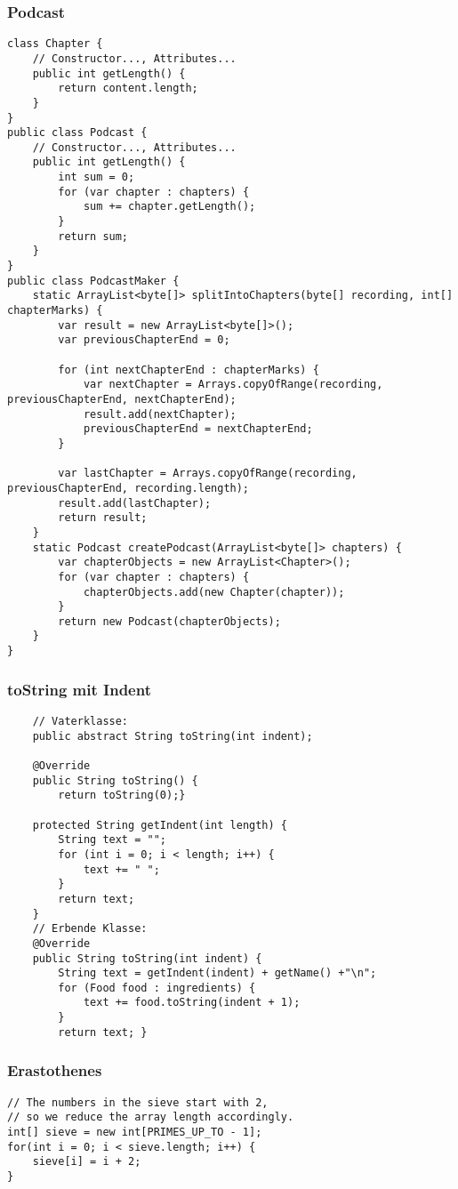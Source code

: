 \begin{multicols*}{5}
	\subsubsection{Podcast}
	\begin{lstlisting}
class Chapter {
	// Constructor..., Attributes...
	public int getLength() {
		return content.length;
	}
}
public class Podcast {
	// Constructor..., Attributes...
	public int getLength() {
		int sum = 0;
		for (var chapter : chapters) {
			sum += chapter.getLength();
		}
		return sum;
	}
}
public class PodcastMaker {
	static ArrayList<byte[]> splitIntoChapters(byte[] recording, int[] chapterMarks) {
		var result = new ArrayList<byte[]>();
		var previousChapterEnd = 0;
		
		for (int nextChapterEnd : chapterMarks) {
			var nextChapter = Arrays.copyOfRange(recording, previousChapterEnd, nextChapterEnd);
			result.add(nextChapter);
			previousChapterEnd = nextChapterEnd;
		}
		
		var lastChapter = Arrays.copyOfRange(recording, previousChapterEnd, recording.length);
		result.add(lastChapter);
		return result;
	}
	static Podcast createPodcast(ArrayList<byte[]> chapters) {
		var chapterObjects = new ArrayList<Chapter>();
		for (var chapter : chapters) {
			chapterObjects.add(new Chapter(chapter));
		}
		return new Podcast(chapterObjects);
	}
}
	\end{lstlisting}

	\subsubsection{toString mit Indent}
	\begin{lstlisting}
	// Vaterklasse:
	public abstract String toString(int indent);			
	
	@Override
	public String toString() {
		return toString(0);}
	
	protected String getIndent(int length) { 
		String text = ""; 
		for (int i = 0; i < length; i++) { 
			text += " ";
		}
		return text;
	}
	// Erbende Klasse:
	@Override
	public String toString(int indent) {
		String text = getIndent(indent) + getName() +"\n";
		for (Food food : ingredients) {
			text += food.toString(indent + 1);
		}
		return text; }
	\end{lstlisting}

	\subsubsection{Erastothenes}
		\begin{lstlisting}
// The numbers in the sieve start with 2,
// so we reduce the array length accordingly.
int[] sieve = new int[PRIMES_UP_TO - 1];
for(int i = 0; i < sieve.length; i++) {
	sieve[i] = i + 2;
}


\end{lstlisting}
\end{multicols*}
